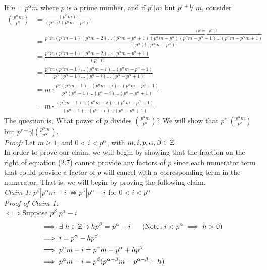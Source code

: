 If $n=p^\alpha m$ where $p$ is a prime number, and if $p^r|m$ but $p^{r+1}\not | \ m$, consider
\begin{align}
    {p^\alpha m \choose p^\alpha} &= \frac{(p^\alpha m)!}{(p^\alpha)!(p^\alpha m - p^\alpha)!} \nonumber \\
    &= \frac{p^\alpha m (p^\alpha m -1)(p^\alpha m - 2)\dots(p^\alpha m - p^\alpha + 1)\overbrace{(p^\alpha m - p^\alpha)(p^\alpha m -p^\alpha -1)\dots(p^\alpha m - p^\alpha m + 1)}^{(p^\alpha m -p^\alpha)!}}{(p^\alpha)!(p^\alpha m -p^\alpha)!} \nonumber \\
    &= \frac{p^\alpha m (p^\alpha m -1)(p^\alpha m - 2)\dots(p^\alpha m - p^\alpha + 1)}{(p^\alpha)!} \nonumber \\
    &= \frac{p^\alpha m (p^\alpha m -1) \dots (p^\alpha m - i) \dots (p^\alpha m - p^\alpha +1)}{p^\alpha (p^\alpha -1) \dots (p^\alpha - i) \dots (p^\alpha - p^\alpha +1)} \nonumber \\
    &= m\cdot \frac{p^\alpha (p^\alpha m -1) \dots (p^\alpha m - i) \dots (p^\alpha m - p^\alpha +1)}{p^\alpha (p^\alpha -1) \dots (p^\alpha - i) \dots (p^\alpha - p^\alpha +1)} \nonumber \\ 
    &= m\cdot \frac{ (p^\alpha m -1) \dots (p^\alpha m - i) \dots (p^\alpha m - p^\alpha +1)}{ (p^\alpha -1) \dots (p^\alpha - i) \dots (p^\alpha - p^\alpha +1)}
\end{align}
The question is, What power of $p$ divides ${p^\alpha m \choose p^\alpha}$? We will show that $p^r | {p^\alpha m \choose p^\alpha}$ but $p^{r+1} \not | {p^\alpha m \choose p^\alpha}$. \\
\textit{Proof:} Let $m\geq 1$, and $0<i<p^\alpha$, with $m,i,p,\alpha,\beta \in {\mathbb{ Z}}$. \steezybreak\\ In order to prove our claim, we will begin by showing that the fraction on the right of equation (2.7) cannot provide any factors of $p$ since each numerator term that could provide a factor of $p$ will cancel with a corresponding term in the numerator. That is, we will begin by proving the following claim. \steezybreak\\
\textit{Claim 1: } $p^\beta | p^\alpha m - i \ \iff p^\beta | p^\alpha - i$  for $0<i<p^\alpha$\steezybreak\\
\textit{Proof of Claim 1:}\steezybreak\\
\textbf{$\Leftarrow$ :} Suppose $p^\beta | p^\alpha -i $
\begin{align}
  &\implies \exists \ h \in \Z \ni hp^\beta = p^\alpha - i \ \ \ \ \ (\text{Note, }i<p^\alpha \implies h > 0)\nonumber \\
  &\implies i = p^\alpha - hp^\beta \nonumber \\
  &\implies p^\alpha m -i = p^\alpha m - p^\alpha + hp^\beta \nonumber \\
  &\implies p^\alpha m -i = p^\beta (p^{\alpha-\beta}m-p^{\alpha-\beta}+h) \nonumber
\end{align}
